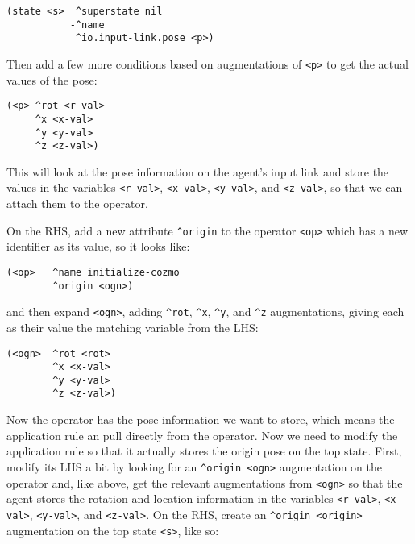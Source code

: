 \begin{verbatim}
(state <s>  ^superstate nil
           -^name
            ^io.input-link.pose <p>)
\end{verbatim}

Then add a few more conditions based on augmentations of
\texttt{\textless{}p\textgreater{}} to get the actual values of the
pose:

\begin{verbatim}
(<p> ^rot <r-val>
     ^x <x-val>
     ^y <y-val>
     ^z <z-val>)
\end{verbatim}

This will look at the pose information on the agent's input link and
store the values in the variables
\texttt{\textless{}r-val\textgreater{}},
\texttt{\textless{}x-val\textgreater{}},
\texttt{\textless{}y-val\textgreater{}}, and
\texttt{\textless{}z-val\textgreater{}}, so that we can attach them to
the operator.

On the RHS, add a new attribute \texttt{\^{}origin} to the operator
\texttt{\textless{}op\textgreater{}} which has a new identifier as its
value, so it looks like:

\begin{verbatim}
(<op>   ^name initialize-cozmo
        ^origin <ogn>)
\end{verbatim}

and then expand \texttt{\textless{}ogn\textgreater{}}, adding
\texttt{\^{}rot}, \texttt{\^{}x}, \texttt{\^{}y}, and \texttt{\^{}z}
augmentations, giving each as their value the matching variable from the
LHS:

\begin{verbatim}
(<ogn>  ^rot <rot>
        ^x <x-val>
        ^y <y-val>
        ^z <z-val>)
\end{verbatim}

Now the operator has the pose information we want to store, which means
the application rule an pull directly from the operator. Now we need to
modify the application rule so that it actually stores the origin pose
on the top state. First, modify its LHS a bit by looking for an
\texttt{\^{}origin\ \textless{}ogn\textgreater{}} augmentation on the
operator and, like above, get the relevant augmentations from
\texttt{\textless{}ogn\textgreater{}} so that the agent stores the
rotation and location information in the variables
\texttt{\textless{}r-val\textgreater{}},
\texttt{\textless{}x-val\textgreater{}},
\texttt{\textless{}y-val\textgreater{}}, and
\texttt{\textless{}z-val\textgreater{}}. On the RHS, create an
\texttt{\^{}origin\ \textless{}origin\textgreater{}} augmentation on the
top state \texttt{\textless{}s\textgreater{}}, like so:


